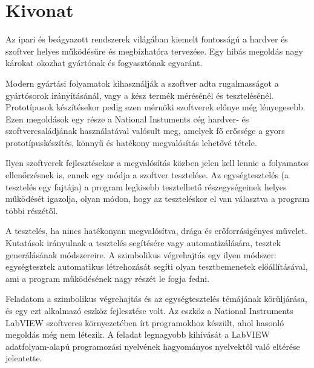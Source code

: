 \setcounter{page}{1}

\selecthungarian

\chapter*{Kivonat}

Az ipari és beágyazott rendszerek világában kiemelt fontosságú a hardver és szoftver helyes működésűre és megbízhatóra tervezése. Egy hibás megoldás nagy károkat okozhat gyártónak és fogyasztónak egyaránt.

Modern gyártási folyamatok kihasználják a szoftver adta rugalmasságot a gyártósorok irányításánál, vagy a kész termék mérésénél és tesztelésénél. Prototípusok készítésekor pedig ezen mérnöki szoftverek előnye még lényegesebb. Ezen megoldások egy része a National Instuments cég hardver- és szoftvercsaládjának használatával valósult meg, amelyek fő erőssége a gyors prototípuskészítés, könnyű és hatékony megvalósítás lehetővé tétele.

Ilyen szoftverek fejlesztésekor a megvalósítás közben jelen kell lennie a folyamatos ellenőrzésnek is, ennek egy módja a szoftver tesztelése. Az egységtesztelés (a tesztelés egy fajtája) a program legkisebb tesztelhető részegységeinek helyes működését igazolja, olyan módon, hogy az teszteléskor el van választva a program többi részétől.

A tesztelés, ha nincs hatékonyan megvalósítva, drága és erőforrásigényes művelet. Kutatások irányulnak a tesztelés segítésére vagy automatizálására, tesztek generálásának módszereire. A szimbolikus végrehajtás egy ilyen módszer: egységtesztek automatikus létrehozását segíti olyan tesztbemenetek előállításával, ami a program működésének nagy részét le fogja fedni.

Feladatom a szimbolikus végrehajtás és az egységtesztelés témájának körüljárása, és egy ezt alkalmazó eszköz fejlesztése volt. Az eszköz a National Instruments LabVIEW szoftveres környezetében írt programokhoz készült, ahol hasonló megoldás még nem létezik. A feladat legnagyobb kihívását a LabVIEW adatfolyam-alapú programozási nyelvének hagyományos nyelvektől való eltérése jelentette.

